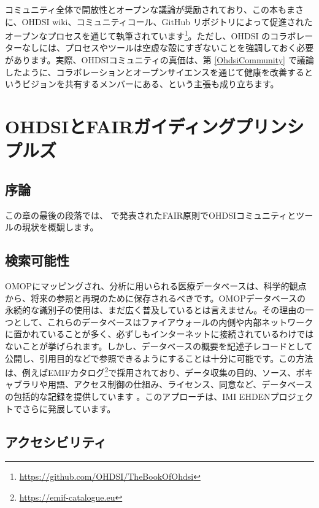 \documentclass[
  11pt]{book}
\theoremstyle{definition}
\theoremstyle{definition}
\theoremstyle{definition}
\theoremstyle{definition}
\theoremstyle{remark}
\begin{document}
コミュニティ全体で開放性とオープンな議論が奨励されており、この本もまさに、OHDSI wiki、コミュニティコール、GitHub リポジトリによって促進されたオープンなプロセスを通じて執筆されています\footnote{\url{https://github.com/OHDSI/TheBookOfOhdsi}}。ただし、OHDSI のコラボレーターなしには、プロセスやツールは空虚な殻にすぎないことを強調しておく必要があります。実際、OHDSIコミュニティの真価は、第 \ref{OhdsiCommunity} で議論したように、コラボレーションとオープンサイエンスを通じて健康を改善するというビジョンを共有するメンバーにある、という主張も成り立ちます。

\section{OHDSIとFAIRガイディングプリンシプルズ}\label{ohdsiux3068fairux30acux30a4ux30c7ux30a3ux30f3ux30b0ux30d7ux30eaux30f3ux30b7ux30d7ux30ebux30ba}


\subsection{序論}\label{ux5e8fux8ad6}

この章の最後の段落では、\citet{wilkinson2016} で発表されたFAIR原則でOHDSIコミュニティとツールの現状を概観します。

\subsection{検索可能性}\label{ux691cux7d22ux53efux80fdux6027}

OMOPにマッピングされ、分析に用いられる医療データベースは、科学的観点から、将来の参照と再現のために保存されるべきです。OMOPデータベースの永続的な識別子の使用は、まだ広く普及しているとは言えません。その理由の一つとして、これらのデータベースはファイアウォールの内側や内部ネットワークに置かれていることが多く、必ずしもインターネットに接続されているわけではないことが挙げられます。しかし、データベースの概要を記述子レコードとして公開し、引用目的などで参照できるようにすることは十分に可能です。この方法は、例えばEMIFカタログ\footnote{\url{https://emif-catalogue.eu}}で採用されており、データ収集の目的、ソース、ボキャブラリや用語、アクセス制御の仕組み、ライセンス、同意など、データベースの包括的な記録を提供しています \citep{Oliveira2019}。このアプローチは、IMI EHDENプロジェクトでさらに発展しています。

\subsection{アクセシビリティ}\label{ux30a2ux30afux30bbux30b7ux30d3ux30eaux30c6ux30a3}
\end{document}
